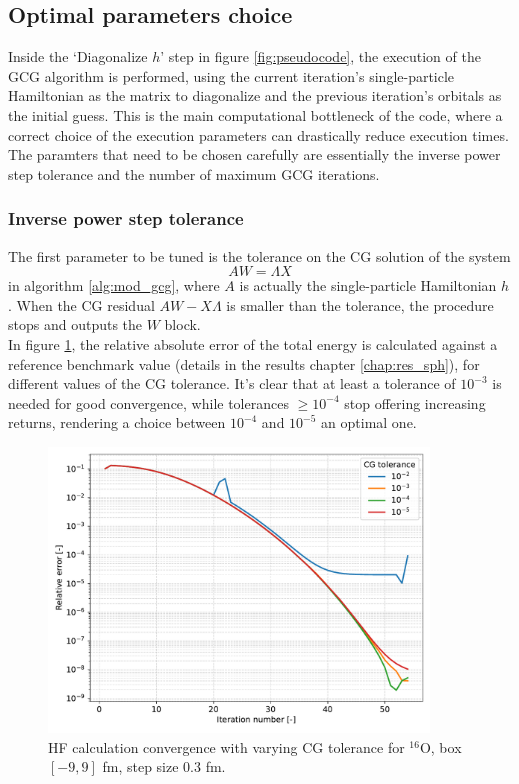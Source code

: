 \subsection{Optimal parameters choice}
Inside the `Diagonalize $h$' step in figure \ref{fig:pseudocode}, the execution of the GCG algorithm is performed, using the current iteration's single-particle Hamiltonian as the matrix to diagonalize and the previous iteration's orbitals as the initial guess. This is the main computational bottleneck of the code, where a correct choice of the execution parameters can drastically reduce execution times.
The paramters that need to be chosen carefully are essentially the inverse power step tolerance and the number of maximum GCG iterations.
\subsubsection{Inverse power step tolerance}
The first parameter to be tuned is the tolerance on the CG solution of the system \begin{equation}
    AW = \Lambda X
\end{equation}
in algorithm \ref{alg:mod_gcg}, where $A$ is actually the single-particle Hamiltonian $h$.
When the CG residual $AW -  X\Lambda$ is smaller than the tolerance, the procedure stops and outputs the $W$ block.
\\In figure \ref{fig:conv_tol}, the relative absolute error of the total energy is calculated against a reference benchmark value (details in the results chapter \ref{chap:res_sph}), for different values of the CG tolerance. It's clear that at least a tolerance of $10^{-3}$ is needed for good convergence, while tolerances $\ge 10^{-4}$ stop offering increasing returns, rendering a choice between $10^{-4}$ and $10^{-5}$ an optimal one.
\begin{figure}[H]
    \centering
    \includegraphics[width=0.9\textwidth]{Images/conv_tol.pdf}
    \caption{HF calculation convergence with varying CG tolerance for $^{16}$O, box $[-9, 9]$ fm, step size $0.3$ fm.} 
    \label{fig:conv_tol}
\end{figure}
